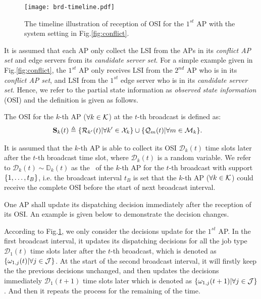 \begin{figure}[t]
    \centering
    \texttt{[image: brd-timeline.pdf]}
    \caption{The timeline illustration of reception of OSI for the $1^{st}$ AP with the system setting in Fig.\ref{fig:conflict}.}
    \label{fig:brd-timeline}
\end{figure}

It is assumed that each AP only collect the LSI from the APs in its \emph{conflict AP set} and edge servers from its \emph{candidate server set}.
For a simple example given in Fig.\ref{fig:conflict}, the $1^{st}$ AP only receives LSI from the $2^{nd}$ AP who is in its \emph{conflict AP set}, and LSI from the $1^{st}$ edge server who is in its \emph{candidate server set}.
Hence, we refer to the partial state information as \emph{observed state information} (OSI) and the definition is given as follows.
\begin{definition}
    The OSI for the $k$-th AP ($\forall k\in\mathcal{K}$) at the $t$-th broadcast is defined as:
    \begin{align}
        \mathbf{S}_{k}(t) &\triangleq \{\mathcal{R}_{k'}(t) | \forall k'\in\mathcal{X}_{k}\}
                         \cup \{\mathcal{Q}_{m}(t) | \forall m\in\mathcal{M}_{k}\}.
        \label{def:OSI}
    \end{align}
\end{definition}

It is assumed that the $k$-th AP is able to collect its OSI $\mathcal{D}_{k}(t)$ time slots later after the $t$-th broadcast time slot, where $\mathcal{D}_{k}(t)$ is a random variable.
We refer to $\mathcal{D}_{k}(t) \sim \mathbb{D}_{k}(t)$ as the \brlatency~of the $k$-th AP for the $t$-th broadcast with support $\{1,\dots,t_B\}$, i.e. the broadcast interval $t_B$ is set that the $k$-th AP ($\forall k\in\mathcal{K}$) could receive the complete OSI before the start of next broadcast interval.

One AP shall update its dispatching decision immediately after the reception of its OSI.
An example is given below to demonstrate the decision changes.
\begin{example}
    According to Fig.\ref{fig:brd-timeline}, we only consider the decisions update for the $1^{st}$ AP.
    In the first broadcast interval, it updates its dispatching decisions for all the job type $\mathcal{D}_{1}(t)$ time slots later after the $t$-th broadcast, which is denoted as $\{\omega_{1,j}(t) | \forall j\in\mathcal{J}\}$.
    At the start of the second broadcast interval, it will firstly keep the the previous decisions unchanged, and then updates the decisions immediately $\mathcal{D}_{1}(t+1)$ time slots later which is denoted as $\{\omega_{1,j}(t+1) | \forall j\in\mathcal{J}\}$.
    And then it repeats the process for the remaining of the time.
\end{example}


